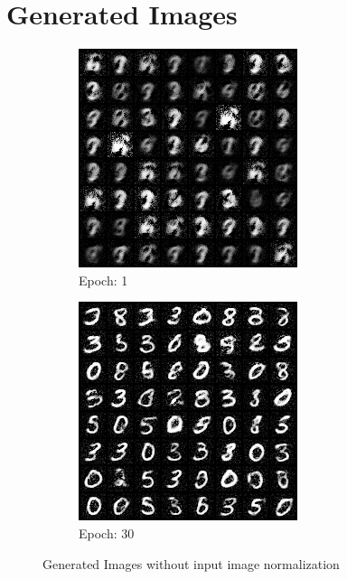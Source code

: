 \documentclass{article}
\begin{document}
\section{Generated Images}
\label{generatedimages}
\begin{figure}[H]
     \centering
     \begin{subfigure}[b]{0.49\textwidth}
         \centering
         \includegraphics[width=\textwidth]{images/epoch01.png}
         \caption{Epoch: 1}
     \end{subfigure}
     \hfill
     \begin{subfigure}[b]{0.49\textwidth}
         \centering
         \includegraphics[width=\textwidth]{images/epoch030.png}
         \caption{Epoch: 30}
     \end{subfigure}
        \caption{Generated Images without input image normalization}
\end{figure}
\end{document}
